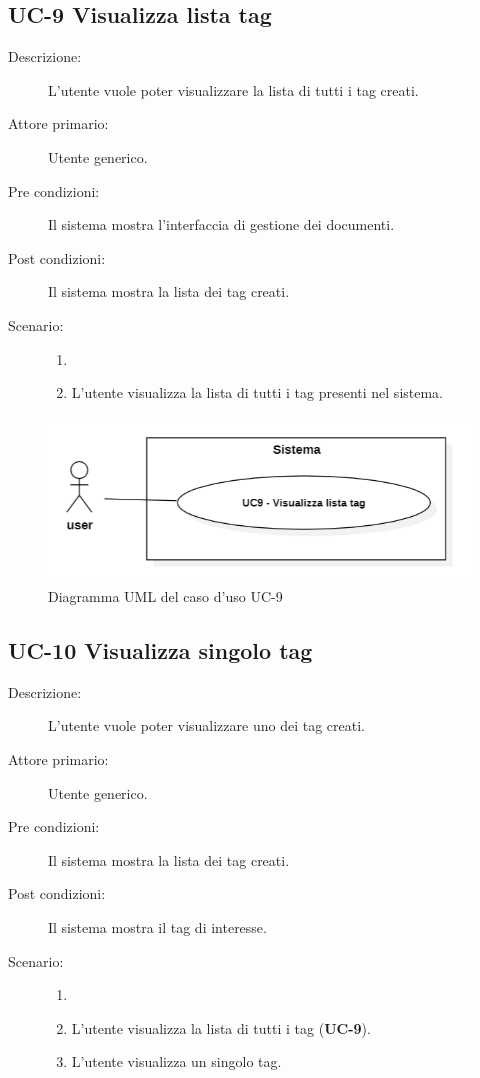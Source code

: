 \subsection{UC-9 Visualizza lista tag}
\begin{description}
    \item[Descrizione:] L’utente vuole poter visualizzare la lista di tutti i tag creati.
    \item[Attore primario:] Utente generico.
    \item[Pre condizioni:] Il sistema mostra l'interfaccia di gestione dei documenti.
    \item[Post condizioni:] Il sistema mostra la lista dei tag creati.
    \item[Scenario:]
    \begin{enumerate}
        \item[]
        \item L’utente visualizza la lista di tutti i tag presenti nel sistema.
    \end{enumerate}
\end{description}
\begin{figure}[H]
    \centering
    \includegraphics[width=0.8\linewidth]{UC9.PNG}
    \caption{Diagramma UML del caso d'uso UC-9}
    \label{fig:UC9}
\end{figure}

\subsection{UC-10 Visualizza singolo tag}
\begin{description}
    \item[Descrizione:] L’utente vuole poter visualizzare uno dei tag creati.
    \item[Attore primario:] Utente generico.
    \item[Pre condizioni:] Il sistema mostra la lista dei tag creati.
    \item[Post condizioni:] Il sistema mostra il tag di interesse.
    \item[Scenario:]
    \begin{enumerate}
        \item[]
        \item L’utente visualizza la lista di tutti i tag (\textbf{UC-9}).
        \item L'utente visualizza un singolo tag.
    \end{enumerate}
\end{description}

